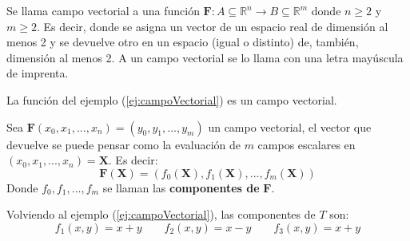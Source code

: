 \begin{definition}
    Se llama campo vectorial a una función $\boldsymbol{F}:A\subseteq \mathbb{R}^n \rightarrow B \subseteq \mathbb{R}^m$
    donde $n\geq2$ y $m\geq2$. Es decir, donde se asigna un vector de un espacio real de dimensión al menos 2 y se devuelve otro
    en un espacio (igual o distinto) de, también, dimensión al menos 2. 
    A un campo vectorial se lo llama con una letra mayúscula de imprenta.
    
    La función del ejemplo (\ref{ej:campoVectorial}) es un campo vectorial.

    Sea $\boldsymbol{F}(x_0,x_1,...,x_n)=(y_0,y_1,...,y_m)$ un campo vectorial, el vector que devuelve
    se puede pensar como la evaluación de $m$ campos escalares en $(x_0,x_1,...,x_n)=\boldsymbol{X}$. 
    Es decir:
    \begin{equation*}
        \boldsymbol{F}(\boldsymbol{X})=(f_0(\boldsymbol{X}),f_1(\boldsymbol{X}),...,f_m(\boldsymbol{X}))
    \end{equation*}
    Donde $f_0,f_1,...,f_m$ se llaman las \textbf{componentes de} $\boldsymbol{F}$.

    Volviendo al ejemplo (\ref{ej:campoVectorial}), las componentes de $T$ son: 
    \begin{equation*}
        f_1(x,y)=x+y\qquad f_2(x,y)=x-y\qquad f_3(x,y)=x+y
    \end{equation*}
\end{definition}

